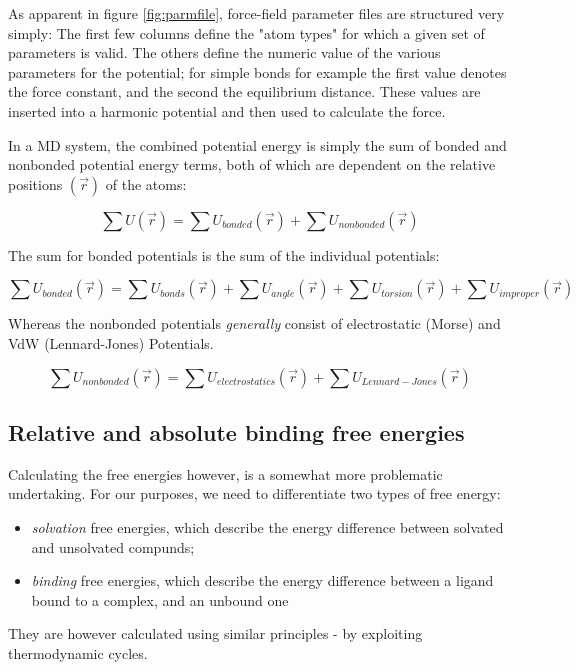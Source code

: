 \documentclass[oneside]{scrreprt}
\begin{document}
As apparent in figure \ref{fig:parmfile}, force-field parameter files are structured very simply: The first few columns define the "atom types" for which a given set of parameters is valid. The others define the numeric value of the various parameters for the potential; for simple bonds for example the first value denotes the force constant, and the second the equilibrium distance. These values are inserted into a harmonic potential and then used to calculate the force. 


In a MD system, the combined potential energy is simply the sum of bonded and nonbonded potential energy terms, both of which are dependent on the relative positions $(\Vec{r})$ of the atoms:


\begin{equation}
    \sum U (\Vec{r}) = \sum U_{bonded} (\Vec{r}) + \sum U_{nonbonded} (\Vec{r})
\end{equation}

The sum for bonded potentials is the sum of the individual potentials:

\begin{equation}
    \sum U_{bonded} (\Vec{r})=\sum U_{bonds} (\Vec{r}) + \sum U_{angle} (\Vec{r}) + \sum U_{torsion} (\Vec{r}) +\sum U_{improper} (\Vec{r})
\end{equation}

Whereas the nonbonded potentials \emph{generally} consist of electrostatic (Morse) and VdW (Lennard-Jones) Potentials.

\begin{equation}
    \sum U_{nonbonded} (\Vec{r})=\sum U_{electrostatics} (\Vec{r}) + \sum U_{Lennard-Jones} (\Vec{r})
\end{equation}




\subsection{Relative and absolute binding free energies}

Calculating the free energies however, is a somewhat more problematic undertaking. For our purposes, we need to differentiate two types of free energy:
\begin{itemize}
    \item \emph{solvation} free energies, which describe the energy difference between solvated and unsolvated compunds;
    \item \emph{binding} free energies, which describe the energy difference between a ligand bound to a complex, and an unbound one
\end{itemize}
They are however calculated using similar principles - by exploiting thermodynamic cycles.
\end{document}
